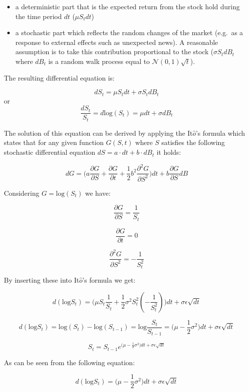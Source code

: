 \documentclass[11pt]{article}
\providecommand{\tightlist}{%
      \setlength{\itemsep}{0pt}\setlength{\parskip}{0pt}}
\begin{document}
\begin{itemize}
\tightlist
\item
  a deterministic part that is the expected return from the stock hold
  during the time period \(dt\) (\(\mu S_tdt\))
\item
  a stochastic part which reflects the random changes of the market
  (e.g.~as a response to external effects such as unexpected news). A
  reasonable assumption is to take this contribution proportional to the
  stock (\(\sigma S_tdB_t\) where \(dB_t\) is a random walk process
  equal to \(\mathcal{N}(0,1)\sqrt{t}\)).
\end{itemize}

    The resulting differential equation is:

\[dS_t = \mu S_tdt + \sigma S_tdB_t\] or
\[\frac{dS_t}{S_t} = d\textrm{log}(S_t) = \mu dt + \sigma dB_t\]

    The solution of this equation can be derived by applying the
It\(\hat{o}\)'s formula which states that for any given function
\(G(S, t)\) where \(S\) satisfies the following stochastic differential
equation \(dS=a\cdot dt +b\cdot dB_t\) it holds:

\[dG=\big(a\frac{\partial G}{\partial S} + \frac{\partial G}{\partial t} + \frac{1}{2}b^2\frac{\partial^2 G}{\partial S^2} \big)dt + b \frac{\partial G}{\partial S}dB\]

Considering \(G = \textrm{log}(S_t)\) we have:

\[\frac{\partial G}{\partial S} = \frac{1}{S_t}\]

\[\frac{\partial G}{\partial t} = 0\]

\[\frac{\partial^2 G}{\partial S^2} = -\frac{1}{S_t^{2}}\]

    By inserting these into It\(\hat{o}\)'s formula we get:

\[d(\textrm{log} S_t) = \big(\mu S_t \frac{1}{S_t} + \frac{1}{2}\sigma^2 S_t^2 (-\frac{1}{S_t^2})\big)dt + \sigma\epsilon\sqrt{dt}\]

\[d(\textrm{log} S_t) = \textrm{log} (S_t) - \textrm{log} (S_{t-1}) = \textrm{log} \frac{S_t}{S_{t-1}} = \big(\mu - \frac{1}{2}\sigma^2\big)dt + \sigma\epsilon\sqrt{dt}\]

\[S_t = S_{t-1}e^{\big(\mu - \frac{1}{2}\sigma^2\big)dt + \sigma\epsilon\sqrt{dt}}\]

    As can be seen from the following equation:

\[d(\textrm{log} S_t) = \big(\mu - \frac{1}{2}\sigma^2\big)dt + \sigma\epsilon\sqrt{dt}\]
\end{document}
